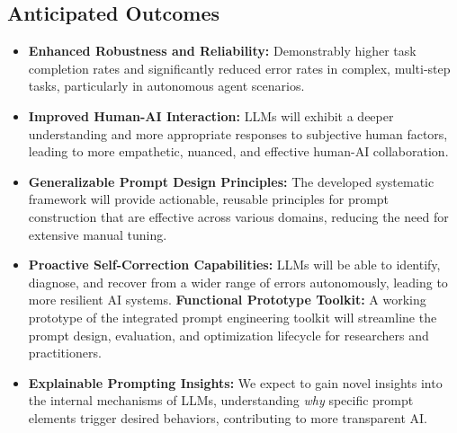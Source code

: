 \documentclass{article}
\begin{document}
\subsection{Anticipated Outcomes}
\begin{itemize}[noitemsep]
    \item \textbf{Enhanced Robustness and Reliability:} Demonstrably higher task completion rates and significantly reduced error rates in complex, multi-step tasks, particularly in autonomous agent scenarios.
    \item \textbf{Improved Human-AI Interaction:} LLMs will exhibit a deeper understanding and more appropriate responses to subjective human factors, leading to more empathetic, nuanced, and effective human-AI collaboration.
    \item \textbf{Generalizable Prompt Design Principles:} The developed systematic framework will provide actionable, reusable principles for prompt construction that are effective across various domains, reducing the need for extensive manual tuning.
    \item \textbf{Proactive Self-Correction Capabilities:} LLMs will be able to identify, diagnose, and recover from a wider range of errors autonomously, leading to more resilient AI systems.
    \textbf{Functional Prototype Toolkit:} A working prototype of the integrated prompt engineering toolkit will streamline the prompt design, evaluation, and optimization lifecycle for researchers and practitioners.
    \item \textbf{Explainable Prompting Insights:} We expect to gain novel insights into the internal mechanisms of LLMs, understanding \textit{why} specific prompt elements trigger desired behaviors, contributing to more transparent AI.
\end{itemize}
\end{document}
